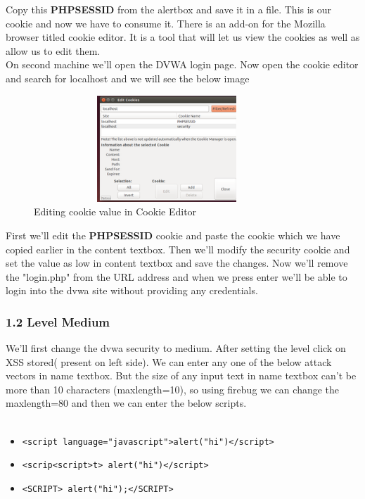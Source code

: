 \documentclass{article}
\begin{document}
Copy this {\bf PHPSESSID} from the alertbox and save it in a file. This is our cookie and now we have to consume it. There is an add-on for the Mozilla browser titled cookie editor. It is a tool that will let us view the cookies as well as allow us to edit them.\\
On second machine we'll open the DVWA login page. Now open the cookie editor and search for localhost and we will see the below image
	\begin{figure}[htb]
	    \begin{center}
		\includegraphics[width=10cm,height=4cm]{cookieeditor.png}
		\caption{Editing cookie value in Cookie Editor}
	    \end{center}
	\end{figure}
First we'll edit the {\bf PHPSESSID} cookie and paste the cookie which we have copied earlier in the content textbox. Then we'll modify the security cookie and set the value as low in content textbox and save the changes. Now we'll remove the "login.php" from the URL address and when we press enter we'll be able to login into the dvwa site without providing any credentials.
\subsubsection*{1.2 Level Medium}
We'll first change the dvwa security to medium. After setting the level click on XSS stored( present on left side). We can enter any one of the  below attack vectors in name textbox. But the size of any input text in name textbox can't be more than 10 characters (maxlength=10), so using firebug we can change the maxlength=80 and then we can enter the below scripts.\\
\\  \begin{itemize}
     \item {\tt <script language="javascript">alert("hi")</script>}
     \item {\tt <scrip<script>t> alert("hi")</script>}
     \item {\tt <SCRIPT> alert("hi");</SCRIPT>}
    \end{itemize}
\end{document}
